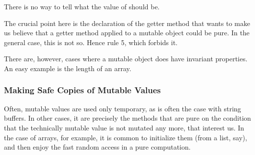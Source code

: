
There is no way to tell what the value of  should be. 

The crucial point here is the declaration of the getter method that wants to make us believe that a getter method applied to a mutable object could be pure. In the general case, this is not so. Hence rule 5, which forbids it.

There are, however, cases where a mutable object does have invariant properties. An easy example is  the length of an array.

\subsubsection{Making Safe Copies of Mutable Values}

Often, mutable values are used only temporary, as is often the case with string buffers. 
In other cases, it are precisely the methods that are pure on the condition that the technically mutable value is not mutated any more, that interest us.
In the case of arrays, for example, it is common to initialize them (from a list, say), and then enjoy the fast random access in a pure computation.

